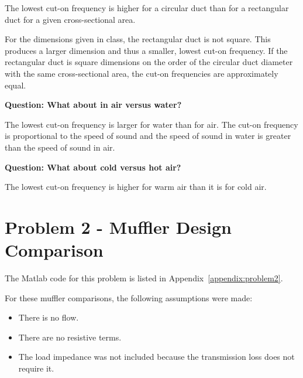 \vspace{0.25cm}
 The lowest cut-on frequency is higher for a circular duct than for a
 rectangular duct for a given cross-sectional area.

\vspace{0.25cm}
 For the dimensions given in class, the rectangular duct is not square.
 This produces a larger dimension and thus a smaller, lowest cut-on
 frequency.  If the rectangular duct is square dimensions on the order
 of the circular duct diameter with the same cross-sectional area, the
 cut-on frequencies are approximately equal.



\vspace{0.25cm}
\textbf{Question:  What about in air versus water?}

\vspace{0.25cm}
 The lowest cut-on frequency is larger for water than for air.  The cut-on
 frequency is proportional to the speed of sound and the speed of sound in
 water is greater than the speed of sound in air.



\vspace{0.25cm}
\textbf{Question:  What about cold versus hot air?}

\vspace{0.25cm}
The lowest cut-on frequency is higher for warm air than it is for cold air.









\newpage
\section*{Problem 2 - Muffler Design Comparison}

The Matlab code for this problem is listed in Appendix~\ref{appendix:problem2}.

\vspace{0.25cm}
For these muffler comparisons, the following assumptions were made:

\begin{itemize}
  \item There is no flow.
  \item There are no resistive terms.
  \item The load impedance was not included because the transmission loss does not require it.
\end{itemize}


